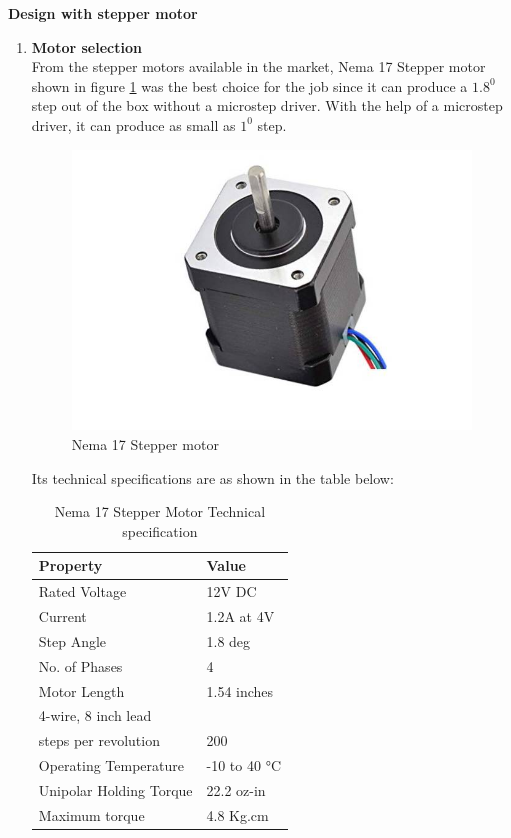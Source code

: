 \begin{enumerate}
    \textbf{Design with stepper motor}
    \begin{enumerate}
    \item \textbf{Motor selection}\\
    From the stepper motors available in the market, Nema 17 Stepper motor shown in figure \ref{fig:Nema17 Steppper motor} was the best choice for the job since it can produce a $1.8^0$ step out of the box without a microstep driver. With the help of a microstep driver, it can produce as small as $1^0$ step.
    \begin{figure}[H]
        \centering
        \includegraphics[width=.3\textwidth, height=.2\textheight]{Figures/Nema17Stepper.jpg}
        \caption[Nema 17 Stepper motor]{Nema 17 Stepper motor \cite{nema17}}
        \label{fig:Nema17 Steppper motor}
    \end{figure}
    \par
    Its technical specifications are as shown in the table below:
    \begin{table}[H]
\centering
\begin{tabular}{|l|l|}
\hline
\textbf{Property} & \textbf{Value} \\ \hline
Rated Voltage & 12V DC \\ \hline
Current & 1.2A at 4V \\ \hline
Step Angle & 1.8 deg \\ \hline
No. of Phases & 4 \\ \hline
Motor Length & 1.54 inches \\ \hline
4-wire, 8 inch lead &  \\ \hline
steps per revolution & 200 \\ \hline
Operating Temperature & -10 to 40 °C \\ \hline
Unipolar Holding Torque & 22.2 oz-in \\ \hline
Maximum torque & 4.8 Kg.cm \\ \hline
\end{tabular}
\caption[Nema 17 Stepper Motor Technical specification]{Nema 17 Stepper Motor Technical specification \cite{nema17}}
\end{table}
    \begin{figure}[H]
        \centering

\end{figure}
\end{enumerate}
\end{enumerate}
